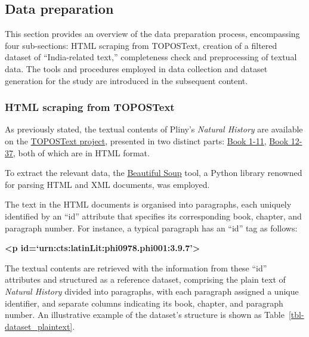 \documentclass[
  12pt,
]{article}
\begin{document}
\hypertarget{data-preparation}{%
\subsection{Data preparation}\label{data-preparation}}

This section provides an overview of the data preparation process,
encompassing four sub-sections: HTML scraping from TOPOSText, creation
of a filtered dataset of ``India-related text,'' completeness check and
preprocessing of textual data. The tools and procedures employed in data
collection and dataset generation for the study are introduced in the
subsequent content.

\hypertarget{html-scraping-from-topostext}{%
\subsubsection{HTML scraping from
TOPOSText}\label{html-scraping-from-topostext}}

As previously stated, the textual contents of Pliny's \emph{Natural
History} are available on the
\href{https://topostext.org/the-project}{TOPOSText project}, presented
in two distinct parts: \href{https://topostext.org/work/148}{Book 1-11},
\href{https://topostext.org/work/153}{Book 12-37}, both of which are in
HTML format.

To extract the relevant data, the
\href{https://www.crummy.com/software/BeautifulSoup/bs4/doc/}{Beautiful
Soup} tool, a Python library renowned for parsing HTML and XML
documents, was employed.

The text in the HTML documents is organised into paragraphs, each
uniquely identified by an ``id'' attribute that specifies its
corresponding book, chapter, and paragraph number. For instance, a
typical paragraph has an ``id'' tag as follows:

\textbf{\textless p
id=`urn:cts:latinLit:phi0978.phi001:3.9.7'\textgreater{}}

The textual contents are retrieved with the information from these
``id'' attributes and structured as a reference dataset, comprising the
plain text of \emph{Natural History} divided into paragraphs, with each
paragraph assigned a unique identifier, and separate columns indicating
its book, chapter, and paragraph number. An illustrative example of the
dataset's structure is shown as Table~\ref{tbl-dataset_plaintext}.
\end{document}
